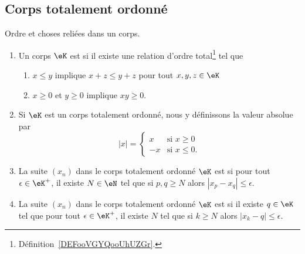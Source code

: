 \subsection{Corps totalement ordonné}

\begin{definition}      \label{DefKCGBooLRNdJf}
	Ordre et choses reliées dans un corps.
	\begin{enumerate}
		\item \label{ITEMooOOOVooJWwIQr}
		      Un corps \( \eK\) est  si il existe une relation d'ordre total\footnote{Définition~\ref{DEFooVGYQooUhUZGr}.} tel que
		      \begin{enumerate}
			      \item       \label{ITEMooZISJooWNxnBj}
			            \( x\leq y\) implique \( x+z\leq y+z\) pour tout \( x,y,z\in \eK\)
			      \item   \label{CONDooBYYDooElXgPO}
			            \( x\geq 0\) et \( y\geq 0\) implique \( xy\geq 0\).
		      \end{enumerate}
		\item       \label{ItemooWUGSooRSRvYC}
		      Si \( \eK\) est un corps totalement ordonné, nous y définissons la valeur absolue par
              \begin{equation}      \label{EQooNONAooHLSERO}
			      | x |=\begin{cases}
				      x  & \text{si }x\geq 0   \\
				      -x & \text{si } x\leq 0.
			      \end{cases}
		      \end{equation}
		\item       \label{ItemVXOZooTYpcYN}
		      La suite \( (x_n)\) dans le corps totalement ordonné \( \eK\) est  si pour tout \( \epsilon\in \eK^+\), il existe \( N\in \eN\) tel que si \( p,q\geq N\) alors \( | x_p-x_q |\leq \epsilon\).
		\item       \label{ITEMooDERQooLmJwFR}
		      La suite \( (x_n)\) dans le corps totalement ordonné \( \eK\) est  si il existe \( q\in \eK\) tel que pour tout \( \epsilon\in \eK^+\), il existe \( N\) tel que si \( k\geq N\) alors \( | x_k-q |\leq \epsilon\).


\end{enumerate}
\end{definition}
